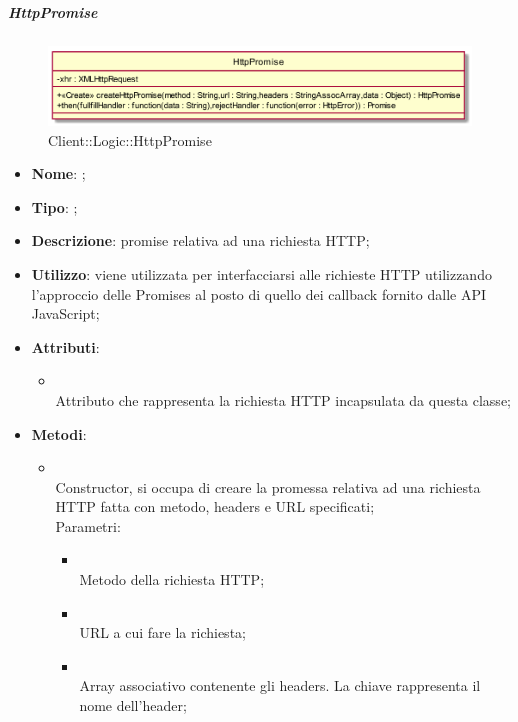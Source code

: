 \hypertarget{HttpPromise_label}{\subparagraph{HttpPromise}}
\begin{figure}[h]
	\centering
	\includegraphics[width=\textwidth,height=\textheight,keepaspectratio]{images/ClassHttpPromise.png}
	\caption{Client::Logic::HttpPromise}
\end{figure}
\begin{itemize}
	\item \textbf{Nome}: ;
	\item \textbf{Tipo}: ;
	\item \textbf{Descrizione}: promise relativa ad una richiesta HTTP;
	\item \textbf{Utilizzo}: viene utilizzata per interfacciarsi alle richieste HTTP utilizzando l'approccio delle Promises al posto di quello dei callback fornito dalle API JavaScript;
	\item \textbf{Attributi}:
	\begin{itemize}
		\item[]  \\
		Attributo che rappresenta la richiesta HTTP incapsulata da questa classe;
	\end{itemize}
	\item \textbf{Metodi}:
	\begin{itemize}
		\item[]  \\		Constructor, si occupa di creare la promessa relativa ad una richiesta HTTP fatta con metodo, headers e URL specificati;\\
		Parametri:
		\begin{itemize}
			\item {} \\
			Metodo della richiesta HTTP;
			\item {} \\
			URL a cui fare la richiesta;
			\item {} \\
			Array associativo contenente gli headers. La chiave rappresenta il nome dell'header;

\end{itemize}
\end{itemize}
\end{itemize}
